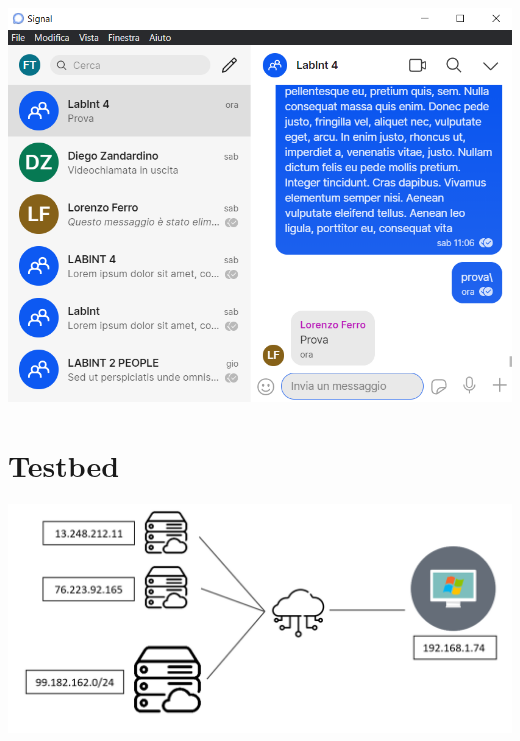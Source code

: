 \documentclass{article}
\begin{document}
   \begin{center}
    \vspace{10pt}
    \includegraphics[scale=0.65]{interfaccia.png}
   \end{center}

   \pagebreak
   
   \section{Testbed}
   \begin{center}
    \includegraphics[scale=0.2]{testbed.png}
\end{center}
\end{document}
